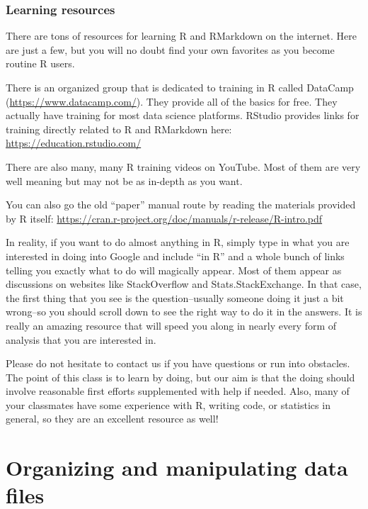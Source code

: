 \documentclass[]{book}
\begin{document}
\hypertarget{learning-resources}{%
\subsection{Learning resources}\label{learning-resources}}

There are tons of resources for learning R and RMarkdown on the internet. Here are just a few, but you will no doubt find your own favorites as you become routine R users.

There is an organized group that is dedicated to training in R called DataCamp (\url{https://www.datacamp.com/}). They provide all of the basics for free. They actually have training for most data science platforms. RStudio provides links for training directly related to R and RMarkdown here:
\url{https://education.rstudio.com/}

There are also many, many R training videos on YouTube. Most of them are very well meaning but may not be as in-depth as you want.

You can also go the old ``paper'' manual route by reading the materials provided by R itself:
\url{https://cran.r-project.org/doc/manuals/r-release/R-intro.pdf}

In reality, if you want to do almost anything in R, simply type in what you are interested in doing into Google and include ``in R'' and a whole bunch of links telling you exactly what to do will magically appear. Most of them appear as discussions on websites like StackOverflow and Stats.StackExchange. In that case, the first thing that you see is the question--usually someone doing it just a bit wrong--so you should scroll down to see the right way to do it in the answers. It is really an amazing resource that will speed you along in nearly every form of analysis that you are interested in.

Please do not hesitate to contact us if you have questions or run into obstacles. The point of this class is to learn by doing, but our aim is that the doing should involve reasonable first efforts supplemented with help if needed. Also, many of your classmates have some experience with R, writing code, or statistics in general, so they are an excellent resource as well!

\hypertarget{organizing-and-manipulating-data-files}{%
\chapter{Organizing and manipulating data files}\label{organizing-and-manipulating-data-files}}
\end{document}
